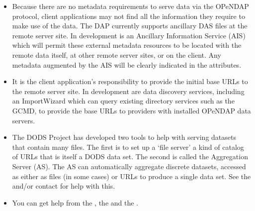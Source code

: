 \documentclass{dods-paper}
\begin{document}
\begin{itemize}

\item Because there are no metadata requirements to serve data via
the OPeNDAP protocol, client applications may not find all the information
they require to make use of the data.  The DAP currently supports ancillary
DAS files at the remote server site.  In development is an Ancillary Information
Service (AIS) which will permit these external metadata resources to be located
with the remote data itself, at other remote server sites, or on the client.   
Any metadata augmented by the AIS will be clearly indicated in the attributes.

\item It is the client application's responsibility to provide the initial base
URLs to the remote server site.  In development are data discovery services, including
an ImportWizard which can query existing directory services such as the GCMD,
to provide the base URLs to providers with installed OPeNDAP data servers.

\item The DODS Project has developed two tools to help with serving datasets
  that contain many files. The first is to set up a `file server' a kind of
  catalog of URLs that is itself a DODS data set. The second is called the
  Aggregation Server (AS). The AS can automatically aggregate discrete
  datasets, accessed as either as files (in some cases) or URLs to produce a
  single data set. See the  and/or contact  for help with this.

\item You can get help from the , the 
  and the .
  
\end{itemize} 
\end{document}
